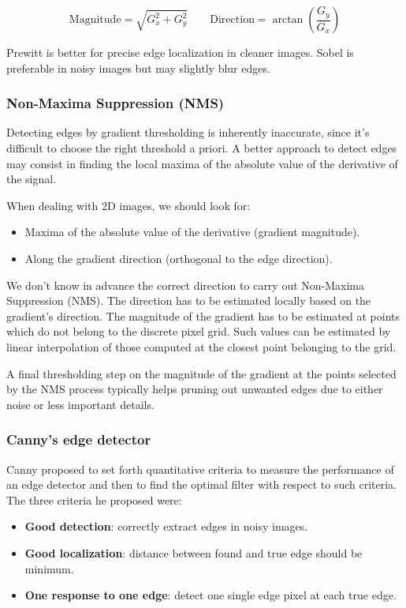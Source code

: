 \documentclass{article}
\begin{document}
$$\text{Magnitude} = \sqrt{G_x^2 + G_y^2} \quad\quad \text{Direction} = \arctan(\frac{G_y}{G_x})$$

Prewitt is better for precise edge localization in cleaner images.
Sobel is preferable in noisy images but may slightly blur edges.


\subsubsection{Non-Maxima Suppression (NMS)}

Detecting edges by gradient thresholding is inherently inaccurate, since it's difficult to choose the right threshold a priori.
A better approach to detect edges may consist in finding the local maxima of the absolute value of the derivative of the signal.

When dealing with 2D images, we should look for:
\begin{itemize}
  \item Maxima of the absolute value of the derivative (gradient magnitude).
  \item Along the gradient direction (orthogonal to the edge direction).
\end{itemize}

We don't know in advance the correct direction to carry out Non-Maxima Suppression (NMS).
The direction has to be estimated locally based on the gradient's direction.
The magnitude of the gradient has to be estimated at points which do not belong to the discrete pixel grid.
Such values can be estimated by linear interpolation of those computed at the closest point belonging to the grid.

A final thresholding step on the magnitude of the gradient at the points selected by the NMS process typically helps pruning out unwanted edges due to either noise or less important details.

\subsubsection{Canny's edge detector}
Canny proposed to set forth quantitative criteria to measure the performance of an edge detector and then to find the optimal filter with respect to such criteria.
The three criteria he proposed were:
\begin{itemize}
  \item \textbf{Good detection}: correctly extract edges in noisy images.
  \item \textbf{Good localization}: distance between found and true edge should be minimum.
  \item \textbf{One response to one edge}: detect one single edge pixel at each true edge.
\end{itemize}
\end{document}
